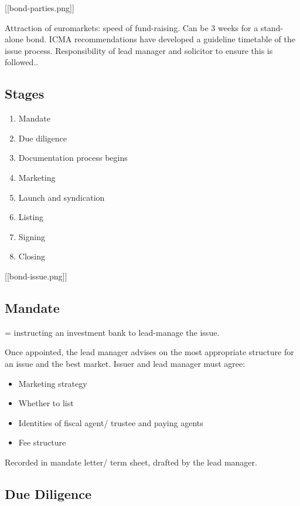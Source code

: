 \documentclass[
]{article}
\providecommand{\tightlist}{%
  \setlength{\itemsep}{0pt}\setlength{\parskip}{0pt}}
\begin{document}
{[}{[}bond-parties.png{]}{]}

Attraction of euromarkets: speed of fund-raising. Can be 3 weeks for a
stand-alone bond. ICMA recommendations have developed a guideline
timetable of the issue process. Responsibility of lead manager and
solicitor to ensure this is followed..

\hypertarget{stages}{%
\subsection{Stages}\label{stages}}

\begin{enumerate}
\def\labelenumi{\arabic{enumi}.}
\tightlist
\item
  Mandate
\item
  Due diligence
\item
  Documentation process begins
\item
  Marketing
\item
  Launch and syndication
\item
  Listing
\item
  Signing
\item
  Closing
\end{enumerate}

{[}{[}bond-issue.png{]}{]}

\hypertarget{mandate}{%
\subsection{Mandate}\label{mandate}}

= instructing an investment bank to lead-manage the issue.

Once appointed, the lead manager advises on the most appropriate
structure for an issue and the best market. Issuer and lead manager must
agree:

\begin{itemize}
\tightlist
\item
  Marketing strategy
\item
  Whether to list
\item
  Identities of fiscal agent/ trustee and paying agents
\item
  Fee structure
\end{itemize}

Recorded in mandate letter/ term sheet, drafted by the lead manager.

\hypertarget{due-diligence}{%
\subsection{Due Diligence}\label{due-diligence}}
\end{document}
